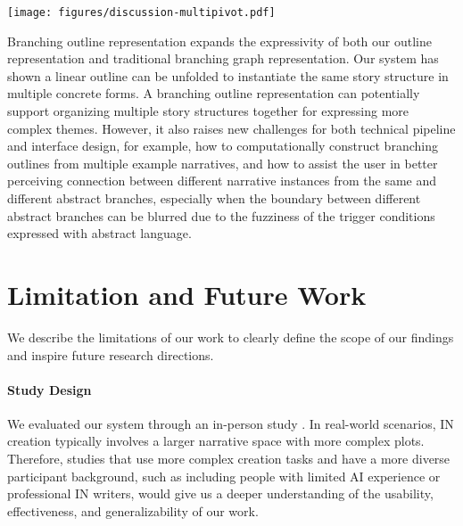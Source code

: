 \begin{figure*}
    \centering
    \texttt{[image: figures/discussion-multipivot.pdf]}
    \caption{}
    \label{fig:multipivot}
    \Description{}
\end{figure*}

Branching outline representation expands the expressivity of both our outline representation and traditional branching graph representation. Our system has shown a linear outline can be unfolded to instantiate the same story structure in multiple concrete forms. A branching outline representation can potentially support organizing multiple story structures together for expressing more complex themes. However, it also raises new challenges for both technical pipeline and interface design, for example, how to computationally construct branching outlines from multiple example narratives, and how to assist the user in better perceiving connection between different narrative instances from the same and different abstract branches, especially when the boundary between different abstract branches can be blurred due to the fuzziness of the trigger conditions expressed with abstract language.

\section{Limitation and Future Work}
\label{sec:limitation}

We describe the limitations of our work to clearly define the scope of our findings and inspire future research directions.


\paragraph{Study Design} We evaluated our system through an in-person study . In real-world scenarios, IN creation typically involves a larger narrative space with more complex plots. Therefore, studies that use more complex creation tasks and have a more diverse participant background, such as including people with limited AI experience or professional IN writers, would give us a deeper understanding of the usability, effectiveness, and generalizability of our work. 



